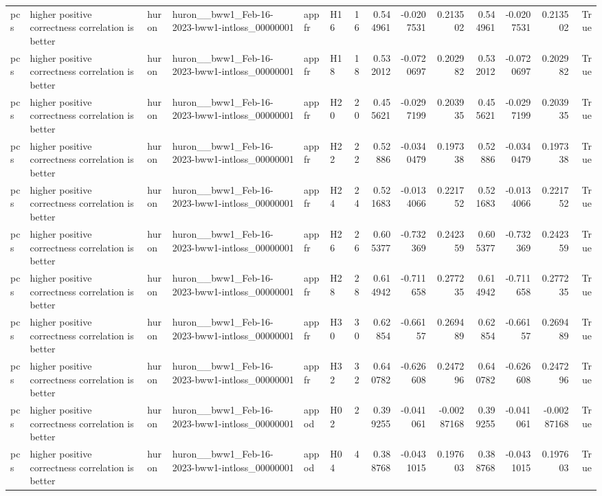 \begin{longtable}{llllllrrrrrrrr}
pcs & higher positive correctness correlation is better & huron & huron\_\_bww1\_Feb-16-2023-bww1-intloss\_00000001 & appfr & H16 & 16 & 0.544961 & -0.0207531 & 0.213502 & 0.544961 & -0.0207531 & 0.213502 & True \\
pcs & higher positive correctness correlation is better & huron & huron\_\_bww1\_Feb-16-2023-bww1-intloss\_00000001 & appfr & H18 & 18 & 0.532012 & -0.0720697 & 0.202982 & 0.532012 & -0.0720697 & 0.202982 & True \\
pcs & higher positive correctness correlation is better & huron & huron\_\_bww1\_Feb-16-2023-bww1-intloss\_00000001 & appfr & H20 & 20 & 0.455621 & -0.0297199 & 0.203935 & 0.455621 & -0.0297199 & 0.203935 & True \\
pcs & higher positive correctness correlation is better & huron & huron\_\_bww1\_Feb-16-2023-bww1-intloss\_00000001 & appfr & H22 & 22 & 0.52886 & -0.0340479 & 0.197338 & 0.52886 & -0.0340479 & 0.197338 & True \\
pcs & higher positive correctness correlation is better & huron & huron\_\_bww1\_Feb-16-2023-bww1-intloss\_00000001 & appfr & H24 & 24 & 0.521683 & -0.0134066 & 0.221752 & 0.521683 & -0.0134066 & 0.221752 & True \\
pcs & higher positive correctness correlation is better & huron & huron\_\_bww1\_Feb-16-2023-bww1-intloss\_00000001 & appfr & H26 & 26 & 0.605377 & -0.732369 & 0.242359 & 0.605377 & -0.732369 & 0.242359 & True \\
pcs & higher positive correctness correlation is better & huron & huron\_\_bww1\_Feb-16-2023-bww1-intloss\_00000001 & appfr & H28 & 28 & 0.614942 & -0.711658 & 0.277235 & 0.614942 & -0.711658 & 0.277235 & True \\
pcs & higher positive correctness correlation is better & huron & huron\_\_bww1\_Feb-16-2023-bww1-intloss\_00000001 & appfr & H30 & 30 & 0.62854 & -0.66157 & 0.269489 & 0.62854 & -0.66157 & 0.269489 & True \\
pcs & higher positive correctness correlation is better & huron & huron\_\_bww1\_Feb-16-2023-bww1-intloss\_00000001 & appfr & H32 & 32 & 0.640782 & -0.626608 & 0.247296 & 0.640782 & -0.626608 & 0.247296 & True \\
pcs & higher positive correctness correlation is better & huron & huron\_\_bww1\_Feb-16-2023-bww1-intloss\_00000001 & appod & H02 & 2 & 0.399255 & -0.041061 & -0.00287168 & 0.399255 & -0.041061 & -0.00287168 & True \\
pcs & higher positive correctness correlation is better & huron & huron\_\_bww1\_Feb-16-2023-bww1-intloss\_00000001 & appod & H04 & 4 & 0.388768 & -0.0431015 & 0.197603 & 0.388768 & -0.0431015 & 0.197603 & True \\

\end{longtable}
